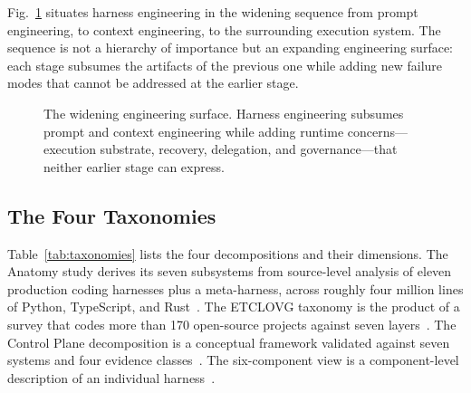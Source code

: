 \documentclass[conference]{IEEEtran}
\begin{document}
Fig.~\ref{fig:scope} situates harness engineering in the widening sequence from prompt engineering, to context engineering, to the surrounding execution system. The sequence is not a hierarchy of importance but an expanding engineering surface: each stage subsumes the artifacts of the previous one while adding new failure modes that cannot be addressed at the earlier stage.

\begin{figure}[t]
\centering
{}

\caption{The widening engineering surface. Harness engineering subsumes prompt and context engineering while adding runtime concerns---execution substrate, recovery, delegation, and governance---that neither earlier stage can express.}
\label{fig:scope}
\end{figure}

\subsection{The Four Taxonomies}

Table~\ref{tab:taxonomies} lists the four decompositions and their dimensions. The Anatomy study derives its seven subsystems from source-level analysis of eleven production coding harnesses plus a meta-harness, across roughly four million lines of Python, TypeScript, and Rust~\cite{b1}. The ETCLOVG taxonomy is the product of a survey that codes more than 170 open-source projects against seven layers~\cite{b2}. The Control Plane decomposition is a conceptual framework validated against seven systems and four evidence classes~\cite{b7}. The six-component view is a component-level description of an individual harness~\cite{b2}.
\end{document}
